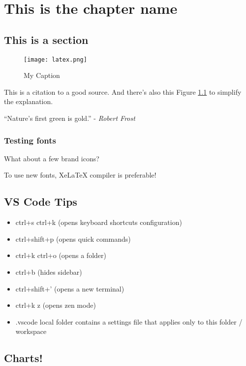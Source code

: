 
\chapter{This is the chapter name}
  
\vspace{1 cm}

\section{This is a section}
    
\begin{figure}[H]
    \centering
    \texttt{[image: latex.png]}
    \caption{My Caption}
    \label{alabel}
\end{figure}

This is a citation \cite{reference_name_3} to a good source. And there's also this Figure \ref{alabel} to simplify the explanation.

“Nature’s first {\color{mygreen} green} is gold.” - \textit{Robert Frost}

\ifdefined \loadedFonts

    \subsection{Testing fonts}

    What about a few brand icons? {\fontawesome{}\selectfont{}  }

    \bigskip

    {   
        \fontbadcomic 
        \fontsize{20pt}{24pt} \selectfont
        To use new fonts, XeLaTeX compiler is preferable!
    }

\fi

\section{VS Code Tips}

\begin{itemize}
    \item ctrl+s ctrl+k (opens keyboard shortcuts configuration)
    \item ctrl+shift+p (opens quick commands)
    \item ctrl+k ctrl+o (opens a folder)
    \item ctrl+b (hides sidebar)
    \item ctrl+shift+' (opens a new terminal)
    \item ctrl+k z (opens zen mode)
    \item .vscode local folder contains a settings file that applies only to this folder / workspace
\end{itemize}

\ifdefined \loadedWheelchart

    \section{Charts!}


\fi
